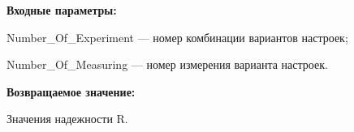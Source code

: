 \textbf{Входные параметры:}

Number\_Of\_Experiment --- номер комбинации вариантов настроек;
 
    Number\_Of\_Measuring --- номер измерения варианта настроек.

\textbf{Возвращаемое значение:}

Значения надежности R.